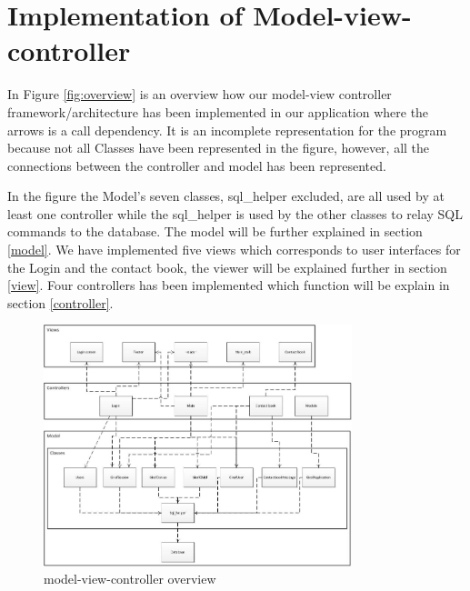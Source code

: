 \section{Implementation of Model-view-controller}
In Figure \vref{fig:overview} is an overview how our model-view controller framework/architecture has been implemented in our application where the arrows is a call dependency. It is an incomplete representation for the program because not all Classes have been represented in the figure, however, all the connections between the controller and model has been represented. 

In the figure the Model's seven classes, sql_helper excluded, are all used by at least one controller while the sql_helper is used by the other classes to relay SQL commands to the database. The model will be further explained in section \vref{model}. We have implemented five views which corresponds to user interfaces for the Login and the contact book, the viewer will be explained further in section \vref{view}. Four controllers has been implemented which function will be explain in section \vref{controller}.

\begin{figure}[ht]
	\centering
		\includegraphics[width=0.80\textwidth]{img/overview.jpg}
	\caption{model-view-controller overview}
	\label{fig:overview}
\end{figure}
